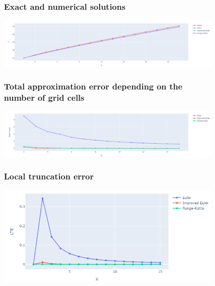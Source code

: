 \documentclass[12pt,letterpaper]{article}
\begin{document}
    \begin{figure}[!h]
    \begin{center}
            \subsubsection*{Exact and numerical solutions}
        \end{center}
        \centering
            \includegraphics[width=1\linewidth]{solutions.png}
    \end{figure}


\begin{figure}[!h]
    \begin{center}
        \subsubsection*{Total approximation error depending on the number of grid cells}
    \end{center}
    \centering
        \includegraphics[width=1\linewidth]{total.png}
\end{figure}

\begin{figure}[!h]
    \begin{center}
        \subsubsection*{Local truncation error}
    \end{center}
    \centering
        \includegraphics[width=1\linewidth]{lte.png}
\end{figure}
\end{document}
